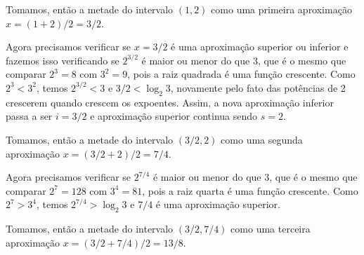 Tomamos, então a metade do intervalo $(1,2)$ como uma primeira aproximação $x=(1+2)/2 = 3/2$.

\begin{figure}[H]
\centering

\end{figure}


Agora precisamos verificar se $x = 3/2$ é uma aproximação superior ou inferior e fazemos isso verificando se $2^{3/2}$ é maior ou menor do que $3$, que é o mesmo que comparar $2^3=8$ com $3^2=9$, pois a raiz quadrada é uma função crescente. Como $2^3 < 3^2$, temos $2^{3/2}<3$ e $3/2<\log_2 3$, novamente pelo fato das potências de 2 crescerem quando crescem os expoentes. Assim, a nova aproximação inferior passa a ser $i=3/2$ e aproximação superior continua sendo $s=2$.

Tomamos, então a metade do intervalo $(3/2, 2)$ como uma segunda aproximação $x=(3/2+2)/2 = 7/4$. 

\begin{figure}[H]
\centering

\end{figure}

Agora precisamos verificar se $2^{7/4}$ é maior ou menor do que $3$, que é o mesmo que comparar $2^7=128$ com $3^4=81$, pois a raiz quarta é uma função crescente. Como $2^7 > 3^4$, temos $2^{7/4}>\log_2 3$ e $7/4$ é uma aproximação superior. 

Tomamos, então a metade do intervalo $(3/2, 7/4)$ como uma terceira aproximação $x=(3/2+7/4)/2 = 13/8$.

